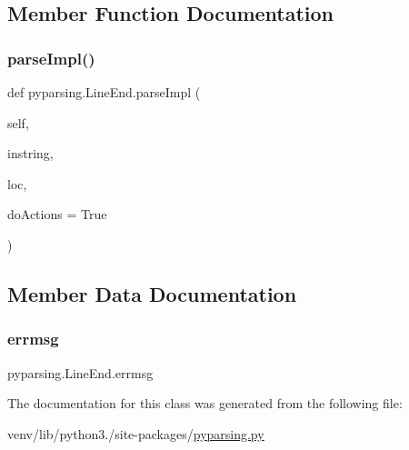 \subsection{Member Function Documentation}
\mbox{\label{classpyparsing_1_1LineEnd_a8f8c4067e2cc0894cc145ebb169243ed}} 
\subsubsection{\texorpdfstring{parse\+Impl()}{parseImpl()}}
{\footnotesize\ttfamily def pyparsing.\+Line\+End.\+parse\+Impl (\begin{DoxyParamCaption}\item[{}]{self,  }\item[{}]{instring,  }\item[{}]{loc,  }\item[{}]{do\+Actions = {\ttfamily True} }\end{DoxyParamCaption})}



\subsection{Member Data Documentation}
\mbox{\label{classpyparsing_1_1LineEnd_ab28bc90ed0d3c8fe64525f3ad88d995c}} 
\subsubsection{\texorpdfstring{errmsg}{errmsg}}
{\footnotesize\ttfamily pyparsing.\+Line\+End.\+errmsg}



The documentation for this class was generated from the following file\+:\begin{DoxyCompactItemize}
\item 
venv/lib/python3./site-\/packages/\hyperlink{pyparsing_8py}{pyparsing.\+py}\end{DoxyCompactItemize}

